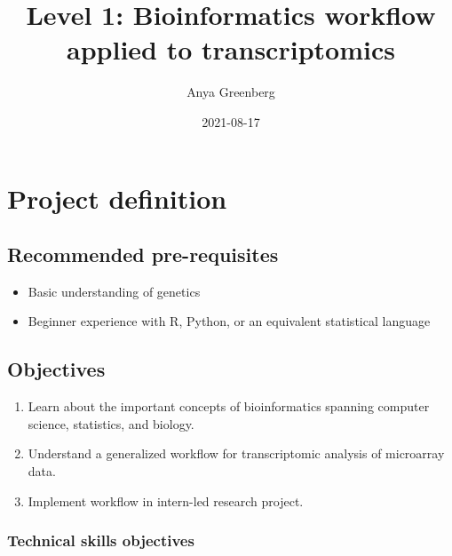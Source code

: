 \documentclass[
]{book}
\title{Level 1: Bioinformatics workflow applied to transcriptomics}
\author{Anya Greenberg}
\date{2021-08-17}
\providecommand{\tightlist}{%
  \setlength{\itemsep}{0pt}\setlength{\parskip}{0pt}}
\theoremstyle{definition}
\theoremstyle{definition}
\theoremstyle{definition}
\theoremstyle{definition}
\theoremstyle{remark}
\begin{document}
\maketitle

{
\setcounter{tocdepth}{1}
\tableofcontents
}
\hypertarget{project-definition}{%
\chapter{Project definition}\label{project-definition}}

\hypertarget{recommended-pre-requisites}{%
\section{Recommended pre-requisites}\label{recommended-pre-requisites}}

\begin{itemize}
\tightlist
\item
  Basic understanding of genetics
\item
  Beginner experience with R, Python, or an equivalent statistical language
\end{itemize}

\hypertarget{objectives}{%
\section{Objectives}\label{objectives}}

\begin{enumerate}
\def\labelenumi{\arabic{enumi}.}
\tightlist
\item
  Learn about the important concepts of bioinformatics spanning computer science, statistics, and biology.
\item
  Understand a generalized workflow for transcriptomic analysis of microarray data.
\item
  Implement workflow in intern-led research project.
\end{enumerate}

\hypertarget{technical-skills-objectives}{%
\subsection{Technical skills objectives}\label{technical-skills-objectives}}
\end{document}
